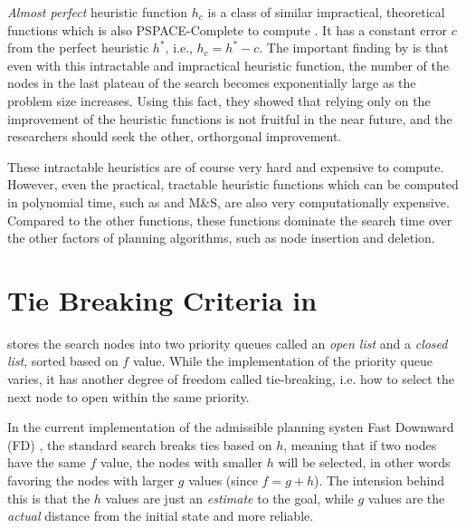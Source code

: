 
\emph{Almost perfect} heuristic function $h_c$ is a class of similar
impractical, theoretical functions which is also PSPACE-Complete to
compute \cite{helmert2008good}.  It has a constant error $c$ from the
perfect heuristic $h^*$, i.e., $h_c=h^*-c$.  The important finding by
\citeauthor{helmert2008good} is that even with this intractable and
impractical heuristic function, the number of the nodes in the last
plateau of the search becomes exponentially large as the problem size
increases.  Using this fact, they showed that relying only on the
improvement of the heuristic functions is not fruitful in the near
future, and the researchers should seek the other,
orthorgonal improvement.

These intractable heuristics are of course very hard and expensive to
compute. However, even the practical, tractable heuristic functions
which can be computed in polynomial time, such as \lmcut and M\&S, are
also very computationally expensive. Compared to the other functions,
these functions dominate the search time over the other factors of
planning algorithms, such as node insertion and deletion.

\section{Tie Breaking Criteria in \astar}


\astar stores the search nodes into two priority queues called an \emph{open list} and a \emph{closed list}, sorted based on $f$ value. While the implementation of the priority queue varies, it has another degree of freedom called tie-breaking, i.e. how to select the next node to open within the same priority.

In the current implementation of the \sota admissible planning systen Fast Downward (FD) \cite{Helmert2006}, the standard \astar search breaks ties based on $h$, meaning that if two nodes have the same $f$ value, the nodes with smaller $h$ will be selected, in other words favoring the nodes with larger $g$ values (since $f=g+h$). The intension behind this is that the $h$ values are just an \emph{estimate} to the goal, while $g$ values are the \emph{actual} distance from the initial state and more reliable.

